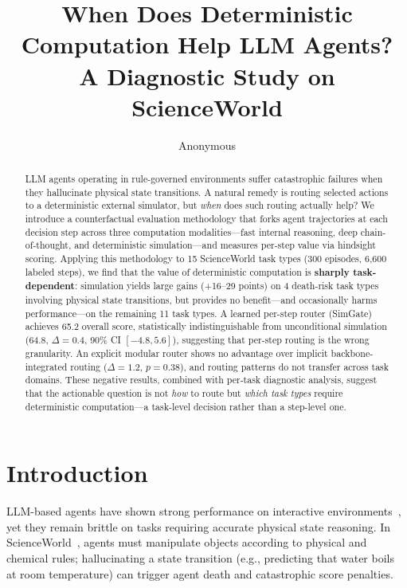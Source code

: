 \documentclass[11pt,a4paper]{article}
\title{When Does Deterministic Computation Help LLM Agents? \\
A Diagnostic Study on ScienceWorld}
\author{Anonymous}
\begin{document}
\maketitle

\begin{abstract}
LLM agents operating in rule-governed environments suffer catastrophic failures when they hallucinate physical state transitions.
A natural remedy is routing selected actions to a deterministic external simulator, but \emph{when} does such routing actually help?
We introduce a counterfactual evaluation methodology that forks agent trajectories at each decision step across three computation modalities---fast internal reasoning, deep chain-of-thought, and deterministic simulation---and measures per-step value via hindsight scoring.
Applying this methodology to 15 ScienceWorld task types (300 episodes, 6{,}600 labeled steps), we find that the value of deterministic computation is \textbf{sharply task-dependent}: simulation yields large gains (+16--29 points) on 4 death-risk task types involving physical state transitions, but provides no benefit---and occasionally harms performance---on the remaining 11 task types.
A learned per-step router (SimGate) achieves 65.2 overall score, statistically indistinguishable from unconditional simulation (64.8, $\Delta{=}0.4$, 90\% CI $[-4.8, 5.6]$), suggesting that per-step routing is the wrong granularity.
An explicit modular router shows no advantage over implicit backbone-integrated routing ($\Delta{=}1.2$, $p{=}0.38$), and routing patterns do not transfer across task domains.
These negative results, combined with per-task diagnostic analysis, suggest that the actionable question is not \emph{how} to route but \emph{which task types} require deterministic computation---a task-level decision rather than a step-level one.
\end{abstract}

\section{Introduction}

LLM-based agents have shown strong performance on interactive environments~\cite{yao2023react,shinn2023reflexion}, yet they remain brittle on tasks requiring accurate physical state reasoning.
In ScienceWorld~\cite{wang2022scienceworld}, agents must manipulate objects according to physical and chemical rules; hallucinating a state transition (e.g., predicting that water boils at room temperature) can trigger agent death and catastrophic score penalties.
\end{document}
